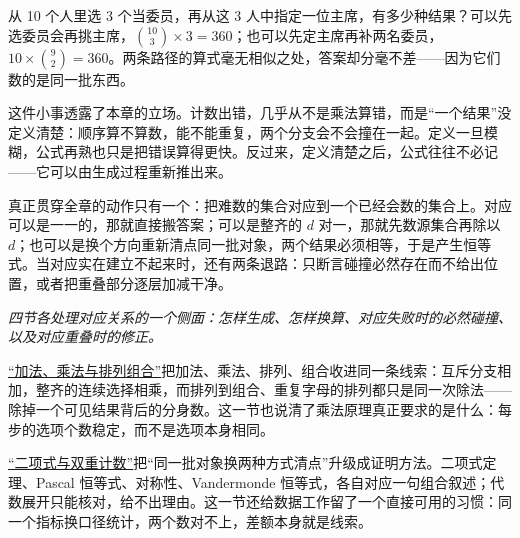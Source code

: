 从 10 个人里选 3 个当委员，再从这 3 人中指定一位主席，有多少种结果？可以先选委员会再挑主席，\(\binom{10}{3}\times3=360\)；也可以先定主席再补两名委员，\(10\times\binom92=360\)。两条路径的算式毫无相似之处，答案却分毫不差——因为它们数的是同一批东西。

这件小事透露了本章的立场。计数出错，几乎从不是乘法算错，而是``一个结果''没定义清楚：顺序算不算数，能不能重复，两个分支会不会撞在一起。定义一旦模糊，公式再熟也只是把错误算得更快。反过来，定义清楚之后，公式往往不必记——它可以由生成过程重新推出来。

真正贯穿全章的动作只有一个：把难数的集合对应到一个已经会数的集合上。对应可以是一一的，那就直接搬答案；可以是整齐的 \(d\) 对一，那就先数源集合再除以 \(d\)；也可以是换个方向重新清点同一批对象，两个结果必须相等，于是产生恒等式。当对应实在建立不起来时，还有两条退路：只断言碰撞必然存在而不给出位置，或者把重叠部分逐层加减干净。

\begin{center}

\emph{四节各处理对应关系的一个侧面：怎样生成、怎样换算、对应失败时的必然碰撞、以及对应重叠时的修正。}
\end{center}

\hyperref[sec:04-Discrete-Mathematics/01-Combinatorics/01]{``加法、乘法与排列组合''}把加法、乘法、排列、组合收进同一条线索：互斥分支相加，整齐的连续选择相乘，而排列到组合、重复字母的排列都只是同一次除法——除掉一个可见结果背后的分身数。这一节也说清了乘法原理真正要求的是什么：每步的选项个数稳定，而不是选项本身相同。

\hyperref[sec:04-Discrete-Mathematics/01-Combinatorics/02]{``二项式与双重计数''}把``同一批对象换两种方式清点''升级成证明方法。二项式定理、Pascal 恒等式、对称性、Vandermonde 恒等式，各自对应一句组合叙述；代数展开只能核对，给不出理由。这一节还给数据工作留了一个直接可用的习惯：同一个指标换口径统计，两个数对不上，差额本身就是线索。

